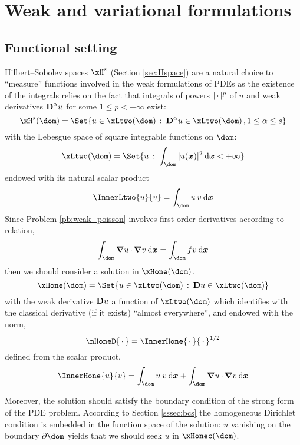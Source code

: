 \section{Weak and variational formulations}\label{sec:weak_forms}

\subsection{Functional setting}

Hilbert--Sobolev spaces $\xH^s$ (Section \ref{sec:Hspace}) are a natural choice to ``measure'' functions involved in the weak formulations of PDEs as the existence of the integrals relies on the fact that integrals of powers $|\,{\mathbf\cdot}\,|^p$ of $u$ and weak derivatives ${\boldsymbol{\mathrm D}}^\alpha u$ for some $1 \leq p < +\infty$ exist:
\begin{equation*}
\xH^s(\dom) = \Set{ u \in \xLtwo(\dom)\,:\: \D^\alpha u \in \xLtwo(\dom)\,, 1 \leq \alpha \leq s }
\end{equation*}
with the Lebesgue space of square integrable functions on $\dom$:
\begin{equation*}
\xLtwo(\dom) = \Set{ u\,:\; \int_\dom |u(\xx)|^2 \dx < +\infty  }
\end{equation*}
endowed with its natural scalar product
\begin{equation*}
\InnerLtwo{u}{v} = \int_\dom u\: v\dx
\end{equation*}
Since Problem \eqref{pb:weak_poisson} involves first order derivatives according to relation,
\begin{equation*}
\int_\dom \Grad u\xDot \Grad v\dx = \int_\dom f v  \dx
\end{equation*}
then we should consider a solution in $\xHone(\dom)$.
\begin{equation*}
\xHone(\dom) = \Set{ u \in \xLtwo(\dom)\,:\: \D u \in \xLtwo(\dom) }
\end{equation*}
with the weak derivative ${\boldsymbol{\mathrm D}} u$ \ie a function of $\xLtwo(\dom)$ which identifies with the classical derivative (if it exists) ``almost everywhere'', and endowed with the norm,
\begin{equation*}
\nHoneD{\xDot} = \InnerHone{\xDot}{\xDot}^{1/2}
\end{equation*}
defined from the scalar product,
\begin{equation*}
\InnerHone{u}{v} = \int_\dom u\: v\dx + \int_\dom \Grad u\xDot \Grad v\dx
\end{equation*}

\medskip
Moreover, the solution should satisfy the boundary condition of the strong form of the PDE problem. According to Section \ref{sssec:bcs} the homogeneous Dirichlet condition is embedded in the function space of the solution: $u$ vanishing on the boundary $\partial \dom$ yields that we should seek $u$ in $\xHonec(\dom)$.

